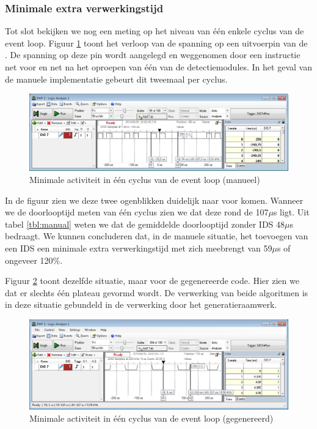 \subsubsection{Minimale extra verwerkingstijd}

Tot slot bekijken we nog een meting op het niveau van \'e\'en enkele cyclus van
de event loop. Figuur \ref{fig:logic-analyser-manual} toont het verloop van de
spanning op een uitvoerpin van de \mcu. De spanning op deze pin wordt aangelegd
en weggenomen door een instructie net voor en net na het oproepen van \'e\'en
van de detectiemodules. In het geval van de manuele implementatie gebeurt dit
tweemaal per cyclus.

\begin{figure}[ht]
  \centering
  \includegraphics[width=\linewidth]{../src/demo/idle-event-loop-both-manual.png}
  \caption{Minimale activiteit in \'e\'en cyclus van de event loop (manueel)}
  \label{fig:logic-analyser-manual}
\end{figure}

In de figuur zien we deze twee ogenblikken duidelijk naar voor komen. Wanneer
we de doorlooptijd meten van \'e\'en cyclus zien we dat deze rond de 107$\mu$s
ligt. Uit tabel \ref{tbl:manual} weten we dat de gemiddelde doorlooptijd
zonder IDS 48$\mu$s bedraagt. We kunnen concluderen dat, in de manuele
situatie, het toevoegen van een IDS een minimale extra verwerkingstijd met zich
meebrengt van 59$\mu$s of ongeveer 120\%.

Figuur \ref{fig:logic-analyser-generated} toont dezelfde situatie, maar voor de
gegenereerde code. Hier zien we dat er slechts \'e\'en plateau gevormd wordt.
De verwerking van beide algoritmen is in deze situatie gebundeld in de
verwerking door het generatieraamwerk.

\begin{figure}[ht]
  \centering
  \includegraphics[width=\linewidth]{../src/demo/idle-event-loop-both-generated.png}
  \caption{Minimale activiteit in \'e\'en cyclus van de event loop (gegenereerd)}
  \label{fig:logic-analyser-generated}
\end{figure}


